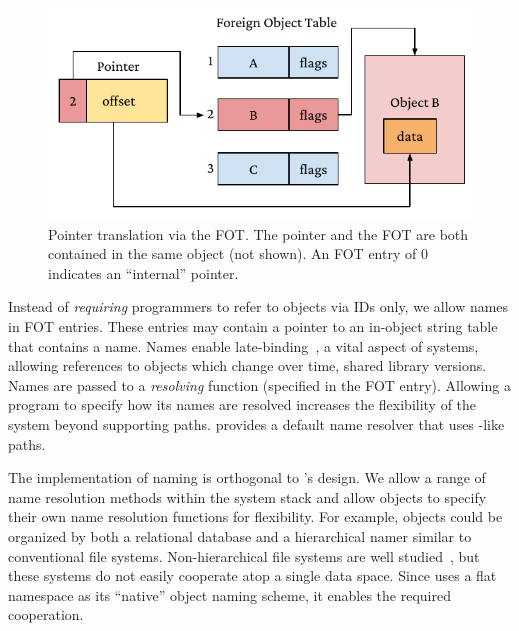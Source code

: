 \begin{figure}
    \includegraphics[width=\linewidth]{fig/ptrfot}
    \caption[FOT translation]{Pointer translation via the FOT\@.
        The pointer and the FOT
        are both contained in the same object (not shown). An FOT entry of $0$ indicates an ``internal''
        pointer.
    }
    \label{fig:fottran}
\end{figure}

Instead of \emph{requiring} programmers to refer to objects via IDs only, we allow
names in FOT entries. These entries may contain a pointer to an
in-object string table that contains a name.
Names enable late-binding~\cite{daley:cacm68}, a
vital aspect of systems, allowing references to objects which change over time, \eg shared library versions.
Names are passed to a \textit{resolving} function (specified in the FOT entry).
Allowing a program to specify how its names are resolved
increases the flexibility of the system beyond supporting \unix paths. \Twizzler
provides a default name resolver that uses \unix-like paths.%

The implementation of naming is orthogonal to \Twizzler's design. We
allow a range of name resolution methods within the system stack
and allow objects to specify their own name resolution functions for flexibility. For example,
objects could be organized by both a relational database and a hierarchical namer
similar to conventional file systems. Non-hierarchical file systems
are well studied~\cite{gifford:sosp91, ames:mss06, padioleau:usenix03, gopal:osdi99,
    parkerwood:systor14}, but these systems do not easily cooperate atop a single data space.
Since \Twizzler uses a flat namespace as its ``native'' object naming scheme, it
enables the required cooperation.


